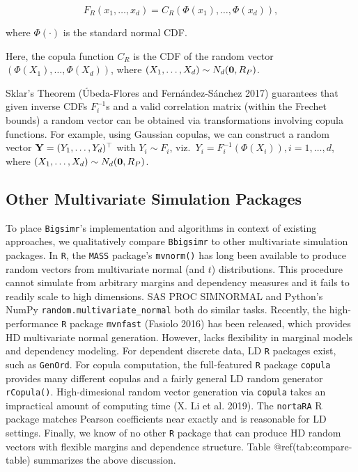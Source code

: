 \documentclass{article}
\begin{document}
\begin{equation}
\label{eq:gauss}
F_R(x_1, \ldots, x_d) = C_R(\Phi(x_1), \ldots, \Phi(x_d)),
\end{equation}

where \(\Phi(\cdot)\) is the standard normal CDF.

Here, the copula function \(C_R\) is the CDF of the random vector
\((\Phi(X_1), \ldots, \Phi(X_d))\), where
\((X_1, \ldots, X_d) \sim N_d({\bf 0}, R_P)\).

Sklar's Theorem (Úbeda-Flores and Fernández-Sánchez 2017) guarantees
that given inverse CDFs \(F_i^{-1}\)s and a valid correlation matrix
(within the Frechet bounds) a random vector can be obtained via
transformations involving copula functions. For example, using Gaussian
copulas, we can construct a random vector
\({\bf Y} = (Y_1, \ldots, Y_d)^\top\) with \(Y_i \sim F_i\),
viz.~\(Y_i = F_i^{-1}(\Phi(X_i)), i=1, \ldots, d\), where
\((X_1, \ldots, X_d) \sim N_d({\bf 0}, R_P)\).

\hypertarget{other-multivariate-simulation-packages}{%
\subsection{Other Multivariate Simulation
Packages}\label{other-multivariate-simulation-packages}}

To place \texttt{Bigsimr}'s implementation and algorithms in context of
existing approaches, we qualitatively compare \texttt{Bbigsimr} to other
multivariate simulation packages. In \texttt{R}, the \texttt{MASS}
package's \texttt{mvnorm()} has long been available to produce random
vectors from multivariate normal (and \(t\)) distributions. This
procedure cannot simulate from arbitrary margins and dependency measures
and it fails to readily scale to high dimensions. SAS PROC SIMNORMAL and
Python's NumPy \texttt{random.multivariate\_normal} both do similar
tasks. Recently, the high-performance \texttt{R} package
\texttt{mvnfast} (Fasiolo 2016) has been released, which provides HD
multivariate normal generation. However, lacks flexibility in marginal
models and dependency modeling. For dependent discrete data, LD
\texttt{R} packages exist, such as \texttt{GenOrd}. For copula
computation, the full-featured \texttt{R} package \texttt{copula}
provides many different copulas and a fairly general LD random generator
\texttt{rCopula()}. High-dimesional random vector generation via
\texttt{copula} takes an impractical amount of computing time (X. Li et
al. 2019). The \texttt{nortaRA} R package matches Pearson coefficients
near exactly and is reasonable for LD settings. Finally, we know of no
other \texttt{R} package that can produce HD random vectors with
flexible margins and dependence structure. Table @ref(tab:compare-table)
summarizes the above discussion.
\end{document}
